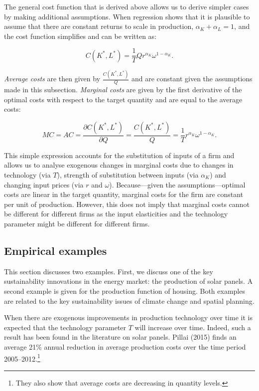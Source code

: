 \documentclass[
]{book}
\begin{document}
The general cost function that is derived above allows us to derive simpler cases by making additional assumptions. When regression shows that it is plausible to assume that there are constant returns to scale in production, \(\alpha_K + \alpha_L =1\), and the cost function simplifies and can be written as:

\begin{equation}
C(K^\ast, L^\ast) = \frac{1}{T}Qr^{\alpha_K}\omega^{1-\alpha_K}.
\end{equation}

\emph{Average costs} are then given by \(\frac{C(K^\ast,L^\ast)}{Q}\) and are constant given the assumptions made in this subsection. \emph{Marginal costs} are given by the first derivative of the optimal costs with respect to the target quantity and are equal to the average costs:

\begin{equation}
MC = AC = \frac{\partial C(K^\ast,L^\ast)}{\partial Q} = \frac{C(K^\ast,L^\ast)}{Q}  = \frac{1}{T}r^{\alpha_K}\omega^{1-\alpha_K}.
\end{equation}

This simple expression accounts for the substitution of inputs of a firm and allows us to analyse exogenous changes in marginal costs due to changes in technology (via \(T\)), strength of substitution between inputs (via \(\alpha_K\)) and changing input prices (via \(r\) and \(\omega\)). Because---given the assumptions---optimal costs are linear in the target quantity, marginal costs for the firm are constant per unit of production. However, this does not imply that marginal costs cannot be different for different firms as the input elasticities and the technology parameter might be different for different firms.

\hypertarget{empirical-examples}{%
\subsection{Empirical examples}\label{empirical-examples}}

This section discusses two examples. First, we discuss one of the key sustainability innovations in the energy market: the production of solar panels. A second example is given for the production function of housing. Both examples are related to the key sustainability issues of climate change and spatial planning.

When there are exogenous improvements in production technology over time it is expected that the technology parameter \(T\) will increase over time. Indeed, such a result has been found in the literature on solar panels. Pillai (2015) finds an average 21\% annual reduction in average production costs over the time period 2005--2012.\footnote{They also show that average costs are decreasing in quantity levels.}
\end{document}
